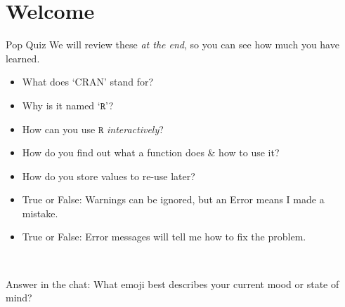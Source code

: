 \documentclass[
  11pt,
  ignorenonframetext,
]{beamer}
\providecommand{\tightlist}{%
  \setlength{\itemsep}{0pt}\setlength{\parskip}{0pt}}
\begin{document}
\hypertarget{welcome}{%
\section{Welcome}\label{welcome}}

\begin{frame}{Pop Quiz}
\protect\hypertarget{pop-quiz}{}
{\footnotesize \textcolor[rgb]{0.66,0.66,0.66}{We will review these \textit{at the end}, so you can see how much you have learned.}}

\begin{itemize}
\tightlist
\item
  What does `CRAN' stand for?
\item
  Why is it named `\(\texttt{R}\)'?
\item
  How can you use \(\texttt{R}\) \emph{interactively}?
\item
  How do you find out what a function does \& how to use it?
\item
  How do you store values to re-use later?
\item
  True or False: Warnings can be ignored, but an Error means I made a
  mistake.
\item
  True or False: Error messages will tell me how to fix the problem.
\end{itemize}

~

\begin{block}{Answer in the chat:}
\protect\hypertarget{answer-in-the-chat}{}
What emoji best describes your current mood or state of mind?
\end{block}
\end{frame}
\end{document}

